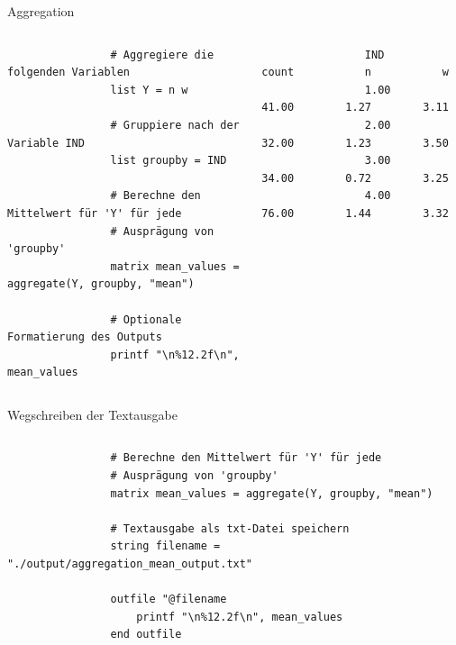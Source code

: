 \documentclass{beamer}[11pt]
\begin{document}
\begin{frame}[fragile]{Aggregation}
	\begin{columns}[T] %
		\scriptsize
		\begin{column}{.62\textwidth}
			\begin{verbatim}
				# Aggregiere die folgenden Variablen
				list Y = n w

				# Gruppiere nach der Variable IND
				list groupby = IND

				# Berechne den Mittelwert für 'Y' für jede
				# Ausprägung von 'groupby'
				matrix mean_values = aggregate(Y, groupby, "mean")

				# Optionale Formatierung des Outputs
				printf "\n%12.2f\n", mean_values
			\end{verbatim}
		\end{column}

		\begin{column}{.4\textwidth}
			\tiny
			\begin{verbatim}
				IND       count           n           w
				1.00       41.00        1.27        3.11
				2.00       32.00        1.23        3.50
				3.00       34.00        0.72        3.25
				4.00       76.00        1.44        3.32
			\end{verbatim}
	  \end{column}
	\end{columns}
\end{frame}


\begin{frame}[fragile]{Wegschreiben der Textausgabe}
	\begin{columns}[T] %
		\small
		\begin{column}{.7\textwidth}
			\begin{verbatim}
				# Berechne den Mittelwert für 'Y' für jede
				# Ausprägung von 'groupby'
				matrix mean_values = aggregate(Y, groupby, "mean")

				# Textausgabe als txt-Datei speichern
				string filename = "./output/aggregation_mean_output.txt"

				outfile "@filename
					printf "\n%12.2f\n", mean_values
				end outfile
			\end{verbatim}
		\end{column}
	\end{columns}
\end{frame}
\end{document}
